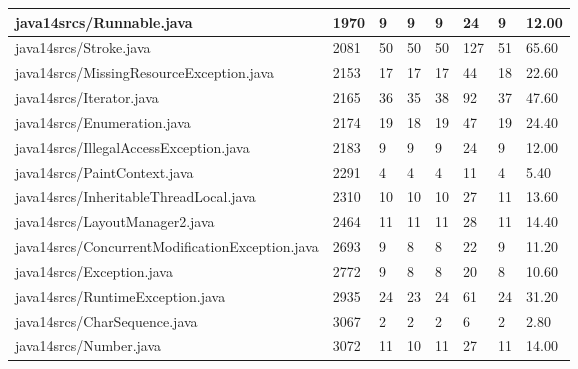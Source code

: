 \begin{tabular}{|l|l|l|l|l|l|l|l|}
\hline
java14srcs/Runnable.java                           & 1970        & 9         & 9         & 9         & 24        & 9         & 12.00     \\
\hline
java14srcs/Stroke.java                             & 2081        & 50        & 50        & 50        & 127       & 51        & 65.60     \\
\hline
java14srcs/MissingResourceException.java           & 2153        & 17        & 17        & 17        & 44        & 18        & 22.60     \\
\hline
java14srcs/Iterator.java                           & 2165        & 36        & 35        & 38        & 92        & 37        & 47.60     \\
\hline
java14srcs/Enumeration.java                        & 2174        & 19        & 18        & 19        & 47        & 19        & 24.40     \\
\hline
java14srcs/IllegalAccessException.java             & 2183        & 9         & 9         & 9         & 24        & 9         & 12.00     \\
\hline
java14srcs/PaintContext.java                       & 2291        & 4         & 4         & 4         & 11        & 4         & 5.40      \\
\hline
java14srcs/InheritableThreadLocal.java             & 2310        & 10        & 10        & 10        & 27        & 11        & 13.60     \\
\hline
java14srcs/LayoutManager2.java                     & 2464        & 11        & 11        & 11        & 28        & 11        & 14.40     \\
\hline
java14srcs/ConcurrentModificationException.java    & 2693        & 9         & 8         & 8         & 22        & 9         & 11.20     \\
\hline
java14srcs/Exception.java                          & 2772        & 9         & 8         & 8         & 20        & 8         & 10.60     \\
\hline
java14srcs/RuntimeException.java                   & 2935        & 24        & 23        & 24        & 61        & 24        & 31.20     \\
\hline
java14srcs/CharSequence.java                       & 3067        & 2         & 2         & 2         & 6         & 2         & 2.80      \\
\hline
java14srcs/Number.java                             & 3072        & 11        & 10        & 11        & 27        & 11        & 14.00     \\

\end{tabular}
